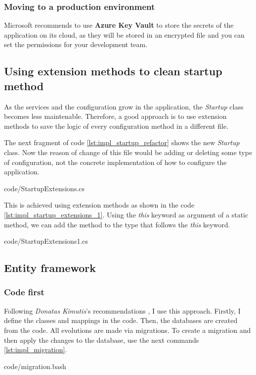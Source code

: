         \subsubsection{Moving to a production environment}
            Microsoft recommends to use \textbf{Azure Key Vault} \cite{AKV} to store the secrets of the application on its cloud, as they will be 
            stored in an encrypted file and you can set the permissions for your development team.

    \subsection{Using extension methods to clean startup method}
        As the services and the configuration grow in the application, the \textit{Startup} class becomes less maintenable. Therefore,
        a good approach is to use extension methods to save the logic of every configuration method in a different file.
        
        The next fragment of code \ref{lst:impl_startup_refactor} shows the new \textit{Startup} class. Now the reason of change of this file would be 
        adding or deleting some type of configuration, not the concrete implementation of how to configure the application.
        
        {code/StartupExtensions.cs}

        This is achieved using extension methods as shown in the code \ref{lst:impl_startup_extensions_1}. Using the \textit{this} keyword as argument of a static method,
        we can add the method to the type that follows the \textit{this} keyword.
        
        {code/StartupExtensions1.cs}

    \subsection{Entity framework}
        \subsubsection{Code first}
            Following \textit{Donatas Kimutis}'s recommendations \cite{Kimutis}, I use this approach. Firstly, I define the classes and mappings in the code. Then, the databases are created from the code. All evolutions are made via migrations.
            To create a migration and then apply the changes to the database, use the next commands \ref{lst:impl_migration}.
            
            {code/migration.bash}

